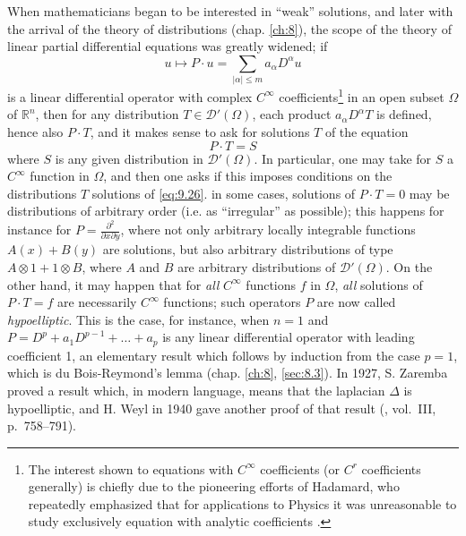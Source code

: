 \documentclass[12pt,a4paper,leqno,twoside]{extbook}
\newcommand{\R}{\mathbb{R}}
\newcommand{\pder}[2]{\frac{\partial #1}{\partial #2}}
\begin{document}
When mathematicians began to be interested in ``weak'' solutions, and later with the arrival of the theory of distributions (chap. \ref{ch:8}), the scope of the theory of linear partial differential equations was greatly widened; if
\begin{equation}
    \label{eq:9.25}
    u \mapsto P \cdot u = \sum_{|\alpha| \leq m} a_\alpha D^\alpha u
\end{equation}
is a linear differential operator with complex \(C^\infty\) coefficients\footnote{The interest shown to equations with \(C^\infty\) coefficients (or \(C^r\) coefficients generally) is chiefly due to the pioneering efforts of Hadamard, who repeatedly emphasized that for applications to Physics it was unreasonable to study exclusively equation with analytic coefficients \cite{093}.} in an open subset \(\Omega\) of \(\R^n\), then for any distribution \(T \in \mathcal{D}'(\Omega)\), each product \(a_\alpha D^\alpha T\) is defined, hence also \(P \cdot T\), and it makes sense to ask for solutions \(T\) of the equation
\begin{equation}
    \label{eq:9.26}
    P \cdot T = S
\end{equation}
where \(S\) is any given distribution in \(\mathcal{D}'(\Omega)\). In particular, one may take for \(S\) a \(C^\infty\) function in \(\Omega\), and then one asks if this imposes conditions on the distributions \(T\) solutions of \eqref{eq:9.26}. in some cases, solutions of \(P \cdot T = 0\) may be distributions of arbitrary order (i.e. as ``irregular'' as possible); this happens for instance for \(P = \pder{^2}{x \partial y}\), where not only arbitrary locally integrable functions \(A(x) + B(y)\) are solutions, but also arbitrary distributions of type \(A \otimes 1 + 1 \otimes B\), where \(A\) and \(B\) are arbitrary distributions of \(\mathcal{D}'(\Omega)\). On the other hand, it may happen that for \emph{all} \(C^\infty\) functions \(f\) in \(\Omega\), \emph{all} solutions of \(P \cdot T = f\) are necessarily \(C^\infty\) functions; such operators \(P\) are now called \emph{hypoelliptic}. This is the case, for instance, when \(n=1\) and \(P = D^p + a_1 D^{p-1} + \ldots + a_p\) is any linear differential operator with leading coefficient 1, an elementary result which follows by induction from the case \(p = 1\), which is du Bois-Reymond's lemma (chap. \ref{ch:8}, \ref{sec:8.3}). In 1927, S. Zaremba \cite{233} proved a result which, in modern language, means that the laplacian \(\Delta\) is hypoelliptic, and H. Weyl in 1940 gave another proof of that result (\cite{227}, vol.~III, p.~758--791).
\end{document}
